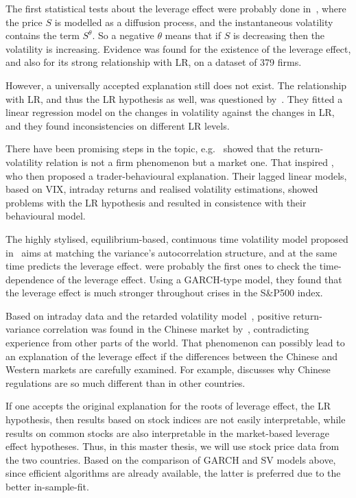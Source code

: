 The first statistical tests about the leverage effect were probably done in~\citet{Christie1982}, where the price $S$ is modelled as a diffusion process, and the instantaneous volatility contains the term $S^\theta$.
So a negative $\theta$ means that if $S$ is decreasing then the volatility is increasing.
Evidence was found for the existence of the leverage effect, and also for its strong relationship with LR, on a dataset of 379 firms.

However, a universally accepted explanation still does not exist.
The relationship with LR, and thus the LR hypothesis as well, was questioned by~\citet{figlewski2000leverage}.
They fitted a linear regression model on the changes in volatility against the changes in LR, and they found inconsistencies on different LR levels.

There have been promising steps in the topic, e.g.~\citet{dennis2006stock} showed that the return-volatility relation is not a firm phenomenon but a market one.
That inspired \citet{Hibbert2008}, who then proposed a trader-behavioural explanation.
Their lagged linear models, based on VIX, intraday returns and realised volatility estimations, showed problems with the LR hypothesis and resulted in consistence with their behavioural model.

The highly stylised, equilibrium-based, continuous time volatility model proposed in~\citet{bollerslev2011volatility} aims at matching the variance's autocorrelation structure, and at the same time predicts the leverage effect.
\citet{christensen2015impact} were probably the first ones to check the time-dependence of the leverage effect.
Using a GARCH-type model, they found that the leverage effect is much stronger throughout crises in the S\&P500 index.

Based on intraday data and the retarded volatility model~\citep{Bouchaud2001}, positive return-variance correlation was found in the Chinese market by~\citet{Shen2009}, contradicting experience from other parts of the world.
That phenomenon can possibly lead to an explanation of the leverage effect if the differences between the Chinese and Western markets are carefully examined.
For example, \citet{GORDON2003} discusses why Chinese regulations are so much different than in other countries.

If one accepts the original explanation for the roots of leverage effect, the LR hypothesis, then results based on stock indices are not easily interpretable, while results on common stocks are also interpretable in the market-based leverage effect hypotheses.
Thus, in this master thesis, we will use stock price data from the two countries.
Based on the comparison of GARCH and SV models above, since efficient algorithms are already available, the latter is preferred due to the better in-sample-fit.
